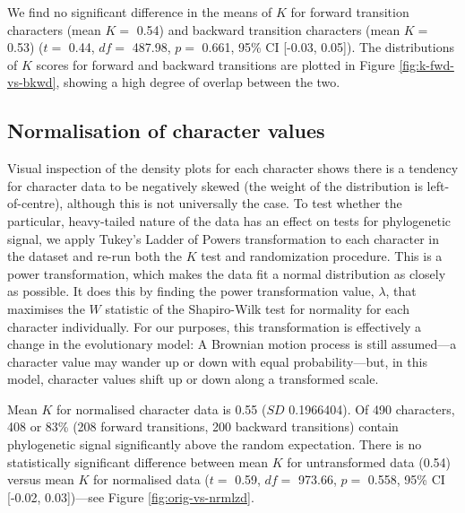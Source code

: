 We find no significant difference in the means of \(K\) for forward transition characters (mean \(K =\) 0.54) and backward transition characters (mean \(K =\) 0.53) (\(t=\) 0.44, \(df=\) 487.98, \(p=\) 0.661, 95\% CI {[}-0.03, 0.05{]}). The distributions of \(K\) scores for forward and backward transitions are plotted in Figure \ref{fig:k-fwd-vs-bkwd}, showing a high degree of overlap between the two.

\hypertarget{norm-characters}{%
\subsection{Normalisation of character values}\label{norm-characters}}

Visual inspection of the density plots for each character shows there is a tendency for character data to be negatively skewed (the weight of the distribution is left-of-centre), although this is not universally the case. To test whether the particular, heavy-tailed nature of the data has an effect on tests for phylogenetic signal, we apply Tukey's Ladder of Powers transformation to each character in the dataset and re-run both the \(K\) test and randomization procedure. This is a power transformation, which makes the data fit a normal distribution as closely as possible. It does this by finding the power transformation value, \(\lambda\), that maximises the \(W\) statistic of the Shapiro-Wilk test for normality for each character individually. For our purposes, this transformation is effectively a change in the evolutionary model: A Brownian motion process is still assumed---a character value may wander up or down with equal probability---but, in this model, character values shift up or down along a transformed scale.

Mean \(K\) for normalised character data is 0.55 (\(SD\) 0.1966404). Of 490 characters, 408 or 83\% (208 forward transitions, 200 backward transitions) contain phylogenetic signal significantly above the random expectation. There is no statistically significant difference between mean \(K\) for untransformed data (0.54) versus mean \(K\) for normalised data (\(t=\) 0.59, \(df=\) 973.66, \(p=\) 0.558, 95\% CI {[}-0.02, 0.03{]})---see Figure \ref{fig:orig-vs-nrmlzd}.

